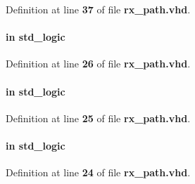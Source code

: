 Definition at line {\bf 37} of file {\bf rx\+\_\+path.\+vhd}.

\paragraph[{clk}]{ {\bfseries \textcolor{keywordflow}{in}\textcolor{vhdlchar}{ }} {\bfseries \textcolor{comment}{std\+\_\+logic}\textcolor{vhdlchar}{ }} \hspace{0.3cm}{\ttfamily [Port]}}\label{classrx__path_a4a4609c199d30b3adebbeb3a01276ec5}


Definition at line {\bf 26} of file {\bf rx\+\_\+path.\+vhd}.

\paragraph[{clk\+\_\+iodirect}]{ {\bfseries \textcolor{keywordflow}{in}\textcolor{vhdlchar}{ }} {\bfseries \textcolor{comment}{std\+\_\+logic}\textcolor{vhdlchar}{ }} \hspace{0.3cm}{\ttfamily [Port]}}\label{classrx__path_a6b08d262ee0d5f41c1da1c75345c9eda}


Definition at line {\bf 25} of file {\bf rx\+\_\+path.\+vhd}.

\paragraph[{clk\+\_\+iopll}]{ {\bfseries \textcolor{keywordflow}{in}\textcolor{vhdlchar}{ }} {\bfseries \textcolor{comment}{std\+\_\+logic}\textcolor{vhdlchar}{ }} \hspace{0.3cm}{\ttfamily [Port]}}\label{classrx__path_acee5ec4ffa4474a43839d26dda7fd987}


Definition at line {\bf 24} of file {\bf rx\+\_\+path.\+vhd}.

